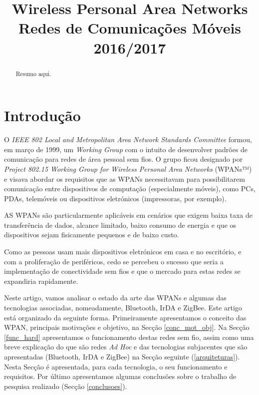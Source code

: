 \documentclass[conference]{IEEEtran}
\begin{document}
\title{Wireless Personal Area Networks\\
  \large Redes de Comunicações Móveis\\
  2016/2017
}

\author{
\and
{}
}

\maketitle

\begin{abstract}
Resumo aqui.
\end{abstract}


\IEEEpeerreviewmaketitle


\section{Introdução}

O \textit{IEEE 802 Local and Metropolitan Area Network Standards Committee} formou, em março de 1999, um \textit{Working Group} com o intuito de desenvolver padrões de comunicação para redes de área pessoal sem fios. 
O grupo ficou designado por \textit{Project 802.15 Working Group for Wireless Personal Area Networks} (WPANs™) e visava abordar os requisitos que as WPANs necessitavam para possibilitarem comunicação entre dispositivos de computação (especialmente móveis), como PCs, PDAs, telemóveis ou dispositivos eletrónicos (impressoras, por exemplo).

AS WPANs são particularmente aplicáveis em cenários que exigem baixa taxa de transferência de dados, alcance limitado, baixo consumo de energia e que os dispositivos sejam fisicamente pequenos e de baixo custo.

Como as pessoas usam mais dispositivos eletrónicos em casa e no escritório, e com a proliferação de periféricos, cedo se percebeu o sucesso que seria a implementação de conectividade sem fios e que o mercado para estas redes se expandiria rapidamente.

Neste artigo, vamos analisar o estado da arte das WPANs e algumas das tecnologias associadas, nomeadamente, Bluetooth, IrDA e ZigBee.
Este artigo está organizado da seguinte forma.
Primeiramente apresentamos o conceito das WPAN, principais motivações e objetivo, na Secção \ref{conc_mot_obj}.
Na Secção \ref{func_hard} apresentamos o funcionamento destas redes sem fio, assim como uma breve explicação do que são redes \textit{Ad Hoc} e das tecnologias subjacentes que são apresentadas (Bluetooth, IrDA e ZigBee) na Secção seguinte (\ref{arquiteturas}).
Nesta Secção é apresentada, para cada tecnologia, o seu funcionamento e requisitos.
Por último apresentamos algumas conclusões sobre o trabalho de pesquisa realizado (Secção \ref{conclusoes}).
\end{document}
